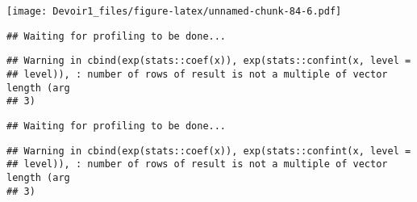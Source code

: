 \documentclass[]{article}
\newenvironment{Shaded}{\begin{snugshade}}{\end{snugshade}}
\newcommand{\KeywordTok}[1]{\textcolor[rgb]{0.13,0.29,0.53}{\textbf{#1}}}
\newcommand{\DataTypeTok}[1]{\textcolor[rgb]{0.13,0.29,0.53}{#1}}
\newcommand{\DecValTok}[1]{\textcolor[rgb]{0.00,0.00,0.81}{#1}}
\newcommand{\StringTok}[1]{\textcolor[rgb]{0.31,0.60,0.02}{#1}}
\newcommand{\OperatorTok}[1]{\textcolor[rgb]{0.81,0.36,0.00}{\textbf{#1}}}
\newcommand{\NormalTok}[1]{#1}
\begin{document}
\texttt{[image: Devoir1\_files/figure-latex/unnamed-chunk-84-6.pdf]}

\begin{Shaded}
\end{Shaded}

\begin{verbatim}
## Waiting for profiling to be done...
\end{verbatim}

\begin{verbatim}
## Warning in cbind(exp(stats::coef(x)), exp(stats::confint(x, level =
## level)), : number of rows of result is not a multiple of vector length (arg
## 3)
\end{verbatim}

\begin{verbatim}
## Waiting for profiling to be done...
\end{verbatim}

\begin{verbatim}
## Warning in cbind(exp(stats::coef(x)), exp(stats::confint(x, level =
## level)), : number of rows of result is not a multiple of vector length (arg
## 3)
\end{verbatim}
\end{document}
